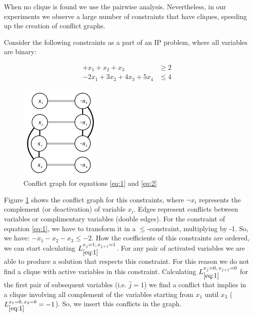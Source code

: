 \documentclass{endm}
\begin{document}
When no clique is found we use the pairwise analysis. Nevertheless, in our experiments we observe a large number of constraints that have cliques, speeding up the creation of conflict graphs.

\begin{example}

Consider the following constraints as a part of an IP problem, where all variables are binary:

\begin{figure}[h]
\begin{minipage}[b]{.5\textwidth}
	\begin{align}
	+x_1 + x_2 + x_3  & \geq 2\label{eq:1}\\
	- 2x_1 + 3x_2 + 4x_3 + 5x_4 & \leq 4\label{eq:2}
	\end{align}
\end{minipage}
\begin{minipage}{.5\textwidth}
	\centering
	\includegraphics[width=4cm]{gconf.pdf}
\end{minipage}
\caption{Conflict graph for equations \ref{eq:1} and \ref{eq:2} }\label{graph}
\end{figure}





Figure \ref{graph} shows the conflict graph for this constraints, where $\neg x_i$ represents the complement (or deactivation) of variable $x_i$. Edges represent conflicts between variables or complimentary variables (double edges). For the constraint of equation \ref{eq:1}, we have to transform it in a $\leq$-constraint, multiplying by -1. So, we have: $- x_1 - x_2 - x_3 \leq - 2$. How the coefficients of this constraints are ordered, we can start calculating $L_{\ref{eq:1}}^{x_{\hat{j}}=1,\, x_{\hat{j}+1}=1}$. For any pair of activated variables we are able to produce a solution that respects this constraint. For this reason we do not find a clique with active variables in this constraint. Calculating $L_{\ref{eq:1}}^{x_{\hat{j}}=0,\, x_{\hat{j}+1}=0}$ for the first pair of subsequent variables (i.e. $\hat{j}=1$) we find a conflict that implies in a clique involving all complement of the variables starting from $x_1$ until $x_3$ ($L_{\ref{eq:1}}^{x_1=0,\, x_2=0} = -1$). So, we insert this conflicts in the graph.


\end{example}
\end{document}
